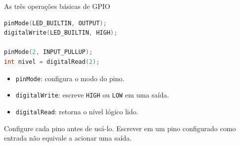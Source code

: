 \begin{frame}[fragile,t]{As três operações básicas de GPIO}
\begin{lstlisting}[language=C++]
pinMode(LED_BUILTIN, OUTPUT);
digitalWrite(LED_BUILTIN, HIGH);

pinMode(2, INPUT_PULLUP);
int nivel = digitalRead(2);
\end{lstlisting}
\begin{itemize}
\item \texttt{pinMode}: configura o modo do pino.
\item \texttt{digitalWrite}: escreve \texttt{HIGH} ou \texttt{LOW} em uma saída.
\item \texttt{digitalRead}: retorna o nível lógico lido.
\end{itemize}
\small Configure cada pino antes de usá-lo. Escrever em um pino configurado como entrada não equivale a acionar uma saída.
\end{frame}
